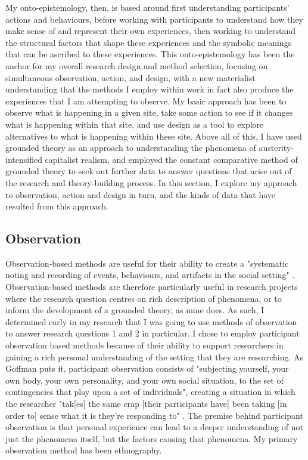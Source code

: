 My onto-epistemology, then, is based around first understanding participants' actions and behaviours, before working with participants to understand how they make sense of and represent their own experiences, then working to understand the structural factors that shape these experiences and the symbolic meanings that can be ascribed to these experiences. This onto-epistemology has been the anchor for my overall research design and method selection, focusing on simultaneous observation, action, and design, with a new materialist understanding that the methods I employ within work in fact also produce the experiences that I am attempting to observe. My basic approach has been to observe what is happening in a given site, take some action to see if it changes what is happening within that site, and use design as a tool to explore alternatives to what is happening within these site. Above all of this, I have used grounded theory as an approach to understanding the phenomena of austerity-intensified capitalist realism, and employed the constant comparative method of grounded theory to seek out further data to answer questions that arise out of the research and theory-building process. In this section, I explore my approach to observation, action and design in turn, and the kinds of data that have resulted from this approach. 

\subsection{Observation}
\label{3-2-1-observation}
Observation-based methods are useful for their ability to create a "systematic noting and recording of events, behaviours, and artifacts in the social setting" \citep[p. 139]{marshall_designing_2010}. Observation-based methods are therefore particularly useful in research projects where the research question centres on rich description of phenomena, or to inform the development of a grounded theory, as mine does. As such, I determined early in my research that I was going to use methods of observation to answer research questions 1 and 2 in particular. I chose to employ participant observation based methods because of their ability to support researchers in gaining a rich personal understanding of the setting that they are researching. As Goffman puts it, participant observation consists of "subjecting yourself, your own body, your own personality, and your own social situation, to the set of contingencies that play upon a set of individuals", creating a situation in which the researcher "tak[es] the same crap [their participants have] been taking [in order to] sense what it is they’re responding to"  \citep[p. 125]{goffman_fieldwork_1989}. The premise behind participant observation is that personal experience can lead to a deeper understanding of not just the phenomena itself, but the factors causing that phenomena. My primary observation method has been ethnography. 


